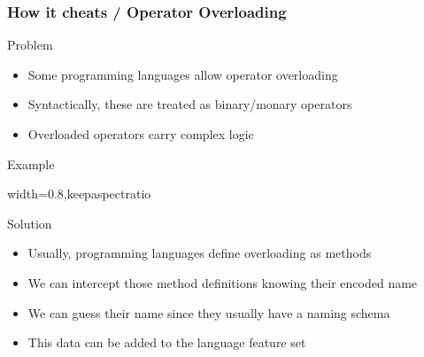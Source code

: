 \documentclass[dvipsnames, 10pt, table]{beamer}
\begin{document}
\begin{frame}
  \frametitle{How it cheats / Operator Overloading}
  \begin{alertblock}{Problem}
    \begin{itemize}
      \item Some programming languages allow operator overloading
      \item Syntactically, these are treated as binary/monary operators
      \item Overloaded operators carry complex logic
    \end{itemize}
  \end{alertblock}
  \begin{block}{Example}
    \center
    \begin{adjustbox}{width=0.8\textwidth,keepaspectratio}
      
    \end{adjustbox}
  \end{block}
  \begin{exampleblock}{Solution}
    \begin{itemize}
      \item Usually, programming languages define overloading as methods
      \item We can intercept those method definitions knowing their encoded name
      \item We can guess their name since they usually have a naming schema
      \item This data can be added to the language feature set
    \end{itemize}
  \end{exampleblock}
\end{frame}
\end{document}
